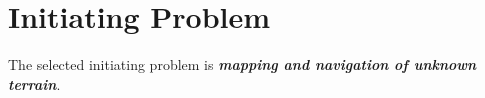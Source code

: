 \section{Initiating Problem}
The selected initiating problem is \textbf{\textit{mapping  and navigation of unknown terrain}}.